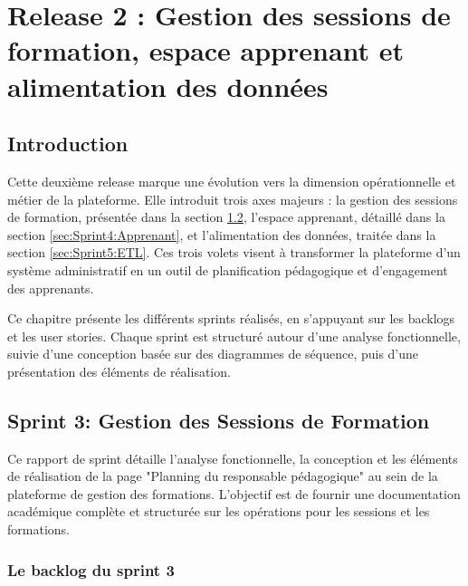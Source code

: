 \chapter{Release 2 : Gestion des sessions de formation, espace apprenant et alimentation des données}
\minitoc
 \newpage
\section{Introduction}
Cette deuxième release marque une évolution vers la dimension opérationnelle et métier de la plateforme. Elle introduit trois axes majeurs : la gestion des sessions de formation, présentée dans la section \ref{sec:Sprint3:Planning}, l'espace apprenant, détaillé dans la section \ref{sec:Sprint4:Apprenant}, et l'alimentation des données, traitée dans la section \ref{sec:Sprint5:ETL}. Ces trois volets visent à transformer la plateforme d'un système administratif en un outil de planification pédagogique et d'engagement des apprenants.

\noindent Ce chapitre présente les différents sprints réalisés, en s'appuyant sur les backlogs et les user stories. Chaque sprint est structuré autour d'une analyse fonctionnelle, suivie d'une conception basée sur des diagrammes de séquence, puis d'une présentation des éléments de réalisation.
\section{Sprint 3: Gestion des Sessions de Formation}
\label{sec:Sprint3:Planning}
Ce rapport de sprint détaille l'analyse fonctionnelle, la conception et les éléments de réalisation de la page "Planning du responsable pédagogique" au sein de la plateforme de gestion des formations. L'objectif est de fournir une documentation académique complète et structurée sur les opérations pour les sessions et les formations.


\subsection{Le backlog du sprint 3}


